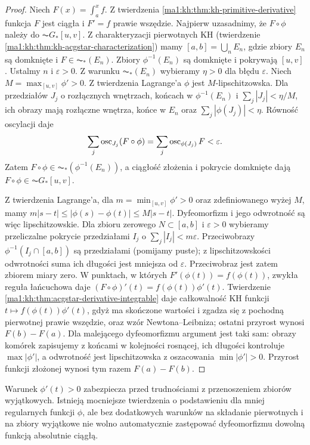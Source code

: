 \begin{proof}
Niech $F(x)=\int_a^x f$. Z twierdzenia \ref{ma1:kh:thm:kh-primitive-derivative}
funkcja $F$ jest ciągła i $F'=f$ prawie wszędzie. Najpierw uzasadnimy, że $F\circ\phi$ należy do $\AC G_*[u,v]$. Z charakteryzacji pierwotnych KH (twierdzenie \ref{ma1:kh:thm:kh-acgstar-characterization}) mamy $[a,b]=\bigcup_n E_n$, gdzie zbiory $E_n$ są domknięte i $F\in\AC_*(E_n)$. Zbiory $\phi^{-1}(E_n)$ są domknięte i pokrywają $[u,v]$. Ustalmy $n$ i $\varepsilon>0$. Z warunku $\AC_*(E_n)$
wybieramy $\eta>0$ dla błędu $\varepsilon$.
Niech $M=\max_{[u,v]}\phi'>0$. Z twierdzenia Lagrange'a
$\phi$ jest $M$-lipschitzowska. Dla przedziałów $J_j$
o rozłącznych wnętrzach, końcach w $\phi^{-1}(E_n)$
i $\sum_j|J_j|<\eta/M$, ich obrazy mają rozłączne
wnętrza, końce w $E_n$ oraz $\sum_j|\phi(J_j)|<\eta$.
Równość oscylacji daje
\[
 \sum_j\operatorname{osc}_{J_j}(F\circ\phi)=\sum_j\operatorname{osc}_{\phi(J_j)}F
 <\varepsilon.
\]
Zatem $F\circ\phi\in\AC_*(\phi^{-1}(E_n))$,
a ciągłość złożenia i pokrycie domknięte dają
$F\circ\phi\in\AC G_*[u,v]$.

Z twierdzenia Lagrange'a, dla $m=\min_{[u,v]}\phi'>0$ oraz zdefiniowanego wyżej $M$, mamy $m|s-t|\le|\phi(s)-\phi(t)|\le M|s-t|$. Dyfeomorfizm i jego odwrotność są więc lipschitzowskie. Dla zbioru zerowego $N\subset[a,b]$ i $\varepsilon>0$
wybieramy przeliczalne pokrycie przedziałami $I_j$
o $\sum_j|I_j|<m\varepsilon$. Przeciwobrazy
$\phi^{-1}(I_j\cap[a,b])$ są przedziałami
(pomijamy puste); z lipschitzowskości odwrotności
suma ich długości jest mniejsza od $\varepsilon$. Przeciwobraz jest zatem zbiorem miary zero. W punktach, w których $F'(\phi(t))=f(\phi(t))$, zwykła reguła łańcuchowa daje $(F\circ\phi)'(t)=f(\phi(t))\phi'(t)$. Twierdzenie \ref{ma1:kh:thm:acgstar-derivative-integrable} daje całkowalność KH funkcji $t\mapsto f(\phi(t))\phi'(t)$, gdyż ma skończone wartości i zgadza się z pochodną pierwotnej prawie wszędzie, oraz wzór Newtona--Leibniza; ostatni przyrost wynosi $F(b)-F(a)$. Dla malejącego dyfeomorfizmu argument jest taki sam: obrazy komórek zapisujemy z końcami w kolejności rosnącej, ich długości kontroluje $\max|\phi'|$, a odwrotność jest lipschitzowska z oszacowania $\min|\phi'|>0$. Przyrost funkcji złożonej wynosi tym razem $F(a)-F(b)$.
\end{proof}
\begin{uwaga}
Warunek $\phi'(t)>0$ zabezpiecza przed trudnościami z przenoszeniem zbiorów wyjątkowych. Istnieją mocniejsze twierdzenia o podstawieniu dla mniej regularnych funkcji $\phi$, ale bez dodatkowych warunków na składanie pierwotnych i na zbiory wyjątkowe nie wolno automatycznie zastępować dyfeomorfizmu dowolną funkcją absolutnie ciągłą.
\end{uwaga}
